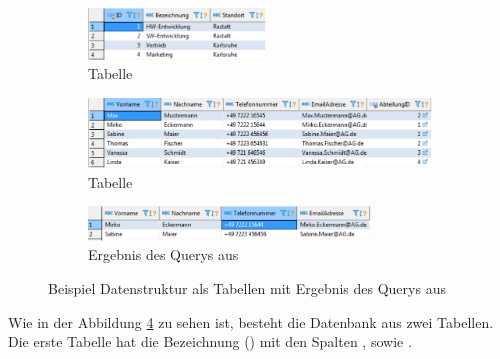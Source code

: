 \begin{figure}[ht]
  \centering
  \begin{subfigure}[h]{\textwidth}
    \centering
    \includegraphics[width=0.517045455\textwidth]{content/hauptteil/theoretischeGrundlagen/rec/exampleSQLAbteilung.pdf}
    \caption{Tabelle }
    \label{fig:exampleSQLStructure:abteilung}
    \hspace{50.00mm}
  \end{subfigure}
  \begin{subfigure}[h]{\textwidth}
      \centering
      \includegraphics[width=\textwidth]{content/hauptteil/theoretischeGrundlagen/rec/exampleSQLMitarbeiterdaten.pdf}
      \caption{Tabelle }
      \label{fig:exampleSQLStructure:mitarbeiter}
      \hspace{50.00mm}
  \end{subfigure}
  \begin{subfigure}[h]{\textwidth}
      \centering
      \includegraphics[width=0.825284091\textwidth]{content/hauptteil/theoretischeGrundlagen/rec/exampleSQLErgebnis.pdf}
      \caption{Ergebnis des Querys aus }
      \label{fig:exampleSQLStructure:result}
  \end{subfigure}
  \caption[Beispiel Datenstruktur mit Ergebnis von einem  Query]{Beispiel Datenstruktur als Tabellen mit Ergebnis des Querys aus }
  \label{fig:exampleSQLStructure}
\end{figure}
Wie in der Abbildung \ref{fig:exampleSQLStructure} zu sehen ist, besteht die Datenbank aus zwei Tabellen.
Die erste Tabelle hat die Bezeichnung  () mit den Spalten ,  sowie .
